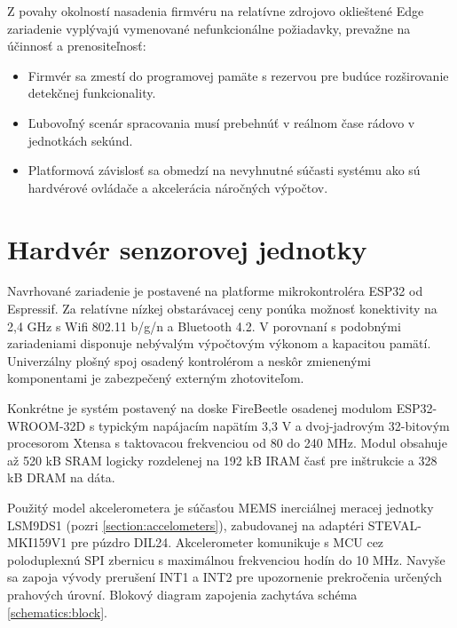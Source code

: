 Z povahy okolností nasadenia firmvéru na relatívne zdrojovo oklieštené Edge zariadenie vyplývajú
vymenované nefunkcionálne požiadavky, prevažne na účinnosť a prenositeľnosť:
\begin{itemize}[noitemsep,topsep=0pt]
\item Firmvér sa zmestí do programovej pamäte s rezervou pre budúce rozširovanie detekčnej funkcionality.
\item Ľubovoľný scenár spracovania musí prebehnúť v reálnom čase rádovo v jednotkách sekúnd.
\item Platformová závislosť sa obmedzí na nevyhnutné súčasti systému ako sú hardvérové ovládače a akcelerácia náročných výpočtov.
\end{itemize}

\section{Hardvér senzorovej jednotky}
Navrhované zariadenie je postavené na platforme mikrokontroléra ESP32 od Espressif. Za relatívne nízkej obstarávacej ceny
ponúka možnosť konektivity na 2,4 GHz s Wifi 802.11 b/g/n a Bluetooth 4.2. V porovnaní s podobnými zariadeniami disponuje
nebývalým výpočtovým výkonom a kapacitou pamätí. Univerzálny plošný spoj osadený kontrolérom a neskôr zmienenými
komponentami je zabezpečený externým zhotoviteľom.

Konkrétne je systém postavený na doske FireBeetle osadenej modulom ESP32-WROOM-32D s typickým napájacím napätím 3,3 V a dvoj-jadrovým
32-bitovým procesorom Xtensa s taktovacou frekvenciou od 80 do 240 MHz. Modul obsahuje až 520 kB SRAM logicky rozdelenej
na 192 kB IRAM časť pre inštrukcie a 328 kB DRAM na dáta.

Použitý model akcelerometera je súčasťou MEMS inerciálnej meracej jednotky LSM9DS1 (pozri \ref{section:accelometers}),
zabudovanej na adaptéri STEVAL-MKI159V1 pre púzdro DIL24. Akcelerometer komunikuje s MCU cez
poloduplexnú SPI zbernicu s maximálnou frekvenciou hodín do 10 MHz. Navyše sa zapoja vývody prerušení INT1 a INT2
pre upozornenie prekročenia určených prahových úrovní. Blokový diagram zapojenia zachytáva schéma \ref{schematics:block}.

